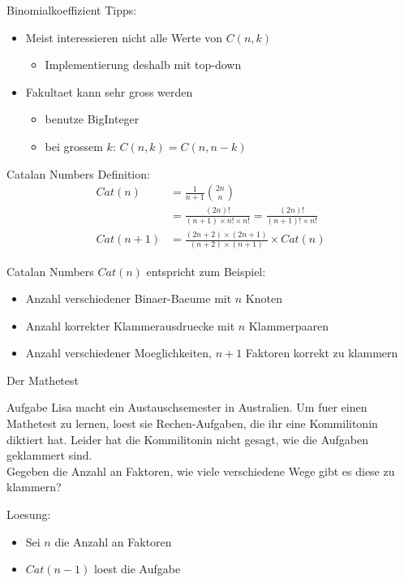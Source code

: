 \documentclass[18pt]{beamer}
\begin{document}
\begin{frame}{Binomialkoeffizient}
Tipps:
\begin{itemize}
\item Meist interessieren nicht alle Werte von $C \left( n, k \right)$
\begin{itemize}
\item Implementierung deshalb mit top-down
\end{itemize}
\item Fakultaet kann sehr gross werden
\begin{itemize}
\item benutze BigInteger
\item bei grossem $k$: $C \left( n, k \right) = C \left( n, n-k \right)$
\end{itemize}
\end{itemize}
\end{frame}

\begin{frame}{Catalan Numbers}
Definition:
\begin{align*}
Cat \left( n \right) &= \frac{1}{n+1} \binom{2n}{n} \\
&= \frac{\left( 2n \right)!}{\left( n+1 \right) \times n! \times n!} = \frac{\left( 2n \right) !}{\left( n+1 \right) ! \times n!} \\
Cat \left( n + 1 \right) &= \frac{\left( 2n + 2 \right) \times \left( 2n + 1 \right)}{\left( n + 2 \right) \times \left( n + 1 \right)} \times Cat \left( n \right)
\end{align*}
\end{frame}

\begin{frame}{Catalan Numbers}
$Cat \left( n \right)$ entspricht zum Beispiel:
\begin{itemize}
\item Anzahl verschiedener Binaer-Baeume mit $n$ Knoten
\item Anzahl korrekter Klammerausdruecke mit $n$ Klammerpaaren
\item Anzahl verschiedener Moeglichkeiten, $n+1$ Faktoren korrekt zu klammern
\end{itemize}
\end{frame}

\begin{frame}{Der Mathetest}
\begin{block}{Aufgabe}
Lisa macht ein Austauschsemester in Australien. Um fuer einen Mathetest zu lernen, loest sie Rechen-Aufgaben, die ihr eine Kommilitonin diktiert hat. Leider hat die Kommilitonin nicht gesagt, wie die Aufgaben geklammert sind. \\
Gegeben die Anzahl an Faktoren, wie viele verschiedene Wege gibt es diese zu klammern?
\end{block}
\pause
Loesung:
\begin{itemize}
\item Sei $n$ die Anzahl an Faktoren
\item $Cat \left( n-1 \right)$ loest die Aufgabe
\end{itemize}
\end{frame}
\end{document}
